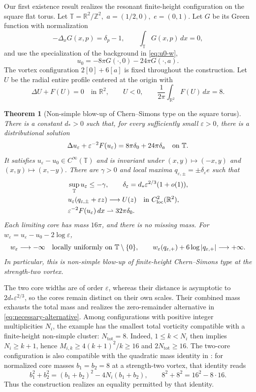 \documentclass[11pt,reqno]{amsart}
\numberwithin{equation}{section}
\newtheorem{theorem}{Theorem}[section]
\theoremstyle{definition}
\theoremstyle{remark}
\newcommand{\R}{\mathbb R}
\newcommand{\T}{\mathbb T}
\newcommand{\eps}{\varepsilon}
\newcommand{\tot}{\mathrm{tot}}
\newcommand{\dd}{\,dx}
\begin{document}
Our first existence result realizes the resonant finite-height configuration
on the square flat torus. Let
\(
 \T=\R^2/\mathbb Z^2,\) \(a=(1/2,0),\) \( e=(0,1).
\)
Let \(G\) be its Green function with normalization
\begin{equation}\label{cs:eq:green}
 -\Delta_xG(x,p)=\delta_p-1,\qquad \int_\T G(x,p)\,dx=0,
\end{equation}
and use the specialization of the background in \eqref{eq:u0-w},
\begin{equation}\label{cs:eq:u0}
 u_0=-8\pi G(\cdot,0)-24\pi G(\cdot,a).
\end{equation}
The vortex configuration \(2[0]+6[a]\) is fixed throughout the construction.
Let \(U\) be the radial entire profile centered at the origin with
\[
 \Delta U+F(U)=0\quad\text{in }\R^2,\qquad U<0,\qquad
 \frac1{2\pi}\int_{\R^2}F(U)\,dx=8.
\]
\begin{theorem}[Non-simple blow-up of Chern--Simons type on the square torus]\label{cs:thm:existence}
There is a constant $d_*>0$ such that, for every sufficiently small $\eps>0$,
there is a distributional solution
\begin{equation}\label{cs:eq:target}
 \Delta u_\eps+\eps^{-2}F(u_\eps)
       =8\pi\delta_0+24\pi\delta_a\quad\hbox{on }\T.
\end{equation}
It satisfies $u_\eps-u_0\in C^\infty(\T)$ and is invariant under
$(x,y)\mapsto(-x,y)$ and $(x,y)\mapsto(x,-y)$.
There are $\gamma>0$ and local maxima
$q_{\eps,\pm}=\pm\delta_\eps e$ such that
\begin{align}
 &\sup_\T u_\eps\le-\gamma,\qquad
 \delta_\eps=d_*\eps^{2/3}(1+o(1)),\label{cs:eq:scale}\\
 &u_\eps(q_{\eps,\pm}+\eps z)\longrightarrow U(z)
             \quad\hbox{in }C^2_{\rm loc}(\R^2),\label{cs:eq:profiles}\\
 &\eps^{-2}F(u_\eps)\dd\rightharpoonup32\pi\delta_0.\label{cs:eq:measure}
\end{align}
Each limiting core has mass $16\pi$, and there is no missing mass.
For $w_\eps=u_\eps-u_0-2\log\eps$,
\[
 w_\eps\longrightarrow-\infty\quad\hbox{locally uniformly on }\T\setminus\{0\},
 \qquad
 w_\eps(q_{\eps,+})+6\log|q_{\eps,+}|\longrightarrow+\infty .
\]
In particular, this is non-simple blow-up of finite-height
Chern--Simons type at the strength-two vortex.
\end{theorem}
The two core widths are of order $\eps$, whereas their distance is
asymptotic to $2d_*\eps^{2/3}$, so the cores remain distinct on their
own scales. Their combined mass exhausts the total mass and realizes
the zero-remainder alternative in \eqref{eq:necessary-alternative}.
Among configurations with positive integer multiplicities $N_i$, the
example has the smallest total vorticity compatible with a finite-height
non-simple cluster: $N_{\tot}=8$. Indeed, $1\le k<N_i$ then implies
$N_i\ge k+1$, hence $M_{i,k}\ge4(k+1)^2/k\ge16$ and $2N_{\tot}\ge16$.
The two-core configuration is also compatible with the quadratic
mass identity in \cite[Theorem~1.2]{LiLiu}: for normalized core masses
$b_1=b_2=8$ at a strength-two vortex, that identity reads
\[
 b_1^2+b_2^2=(b_1+b_2)^2-4N_i(b_1+b_2),
 \qquad 8^2+8^2=16^2-8\cdot16.
\]
Thus the construction realizes an equality permitted by that identity.
\end{document}

